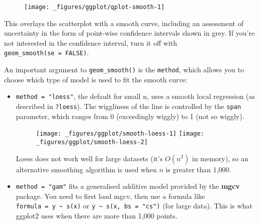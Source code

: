 \begin{figure}[H]
  \centering
  \texttt{[image: \_figures/ggplot/qplot-smooth-1]}
\end{figure}

This overlays the scatterplot with a smooth curve, including an
assessment of uncertainty in the form of point-wise confidence intervals
shown in grey. If you're not interested in the confidence interval, turn
it off with \texttt{geom\_smooth(se\ =\ FALSE)}.

An important argument to \texttt{geom\_smooth()} is the \texttt{method},
which allows you to choose which type of model is used to fit the smooth
curve:

\begin{itemize}
\item
  \texttt{method\ =\ "loess"}, the default for small n, uses a smooth
  local regression (as described in \texttt{?loess}). The wiggliness of
  the line is controlled by the \texttt{span} parameter, which ranges
  from 0 (exceedingly wiggly) to 1 (not so wiggly).

\begin{Shaded}
\begin{Highlighting}[]
\StringTok{ }
\StringTok{  }\NormalTok{() +}\StringTok{ }
\StringTok{  }\NormalTok{(} \NormalTok{)}

\StringTok{ }
\StringTok{  }\NormalTok{() +}\StringTok{ }
\StringTok{  }\NormalTok{(} \NormalTok{)}
\end{Highlighting}
\end{Shaded}

  \begin{figure}[H]
    \texttt{[image: \_figures/ggplot/smooth-loess-1]}%
    \texttt{[image: \_figures/ggplot/smooth-loess-2]}
  \end{figure}

  Loess does not work well for large datasets (it's \(O(n^2)\) in
  memory), so an alternative smoothing algorithm is used when \(n\) is
  greater than 1,000.
\item
  \texttt{method\ =\ "gam"} fits a generalised additive model provided
  by the \textbf{mgcv} package. You need to first load mgcv, then use a
  formula like \texttt{formula\ =\ y\ \textasciitilde{}\ s(x)} or
  \texttt{y\ \textasciitilde{}\ s(x,\ bs\ =\ "cs")} (for large data).
  This is what ggplot2 uses when there are more than 1,000 points.


\end{itemize}
